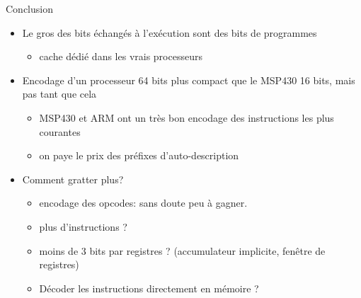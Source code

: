 \documentclass[slidetop,11pt,table]{beamer}
\begin{document}
%   
%   

\begin{frame}{Conclusion}
  \begin{itemize}
  \item Le gros des bits échangés à l'exécution sont des bits de programmes
    \begin{itemize}
    \item cache dédié dans les vrais processeurs
    \end{itemize}
  \item Encodage d'un processeur 64 bits plus compact que le MSP430 16 bits, mais pas tant que cela
    \begin{itemize}
    \item MSP430 et ARM ont un très bon encodage des instructions les plus courantes
    \item on paye le prix des préfixes d'auto-description
    \end{itemize}
  \item Comment gratter plus?
    \begin{itemize}
    \item encodage des opcodes: sans doute peu à gagner.
    \item plus d’instructions ?
    \item moins de 3 bits par registres ? (accumulateur implicite, fenêtre de registres)
    \item Décoder les instructions directement en mémoire ?
    \end{itemize}
  \end{itemize}

\end{frame}
\end{document}
